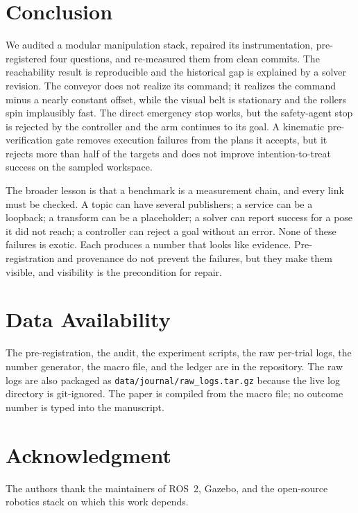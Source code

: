 \documentclass[journal]{IEEEtran}
\begin{document}
\section{Conclusion}
\label{sec:conclusion}
We audited a modular manipulation stack, repaired its instrumentation, pre-registered four questions, and re-measured them from clean commits. The reachability result is reproducible and the historical gap is explained by a solver revision. The conveyor does not realize its command; it realizes the command minus a nearly constant offset, while the visual belt is stationary and the rollers spin implausibly fast. The direct emergency stop works, but the safety-agent stop is rejected by the controller and the arm continues to its goal. A kinematic pre-verification gate removes execution failures from the plans it accepts, but it rejects more than half of the targets and does not improve intention-to-treat success on the sampled workspace.

The broader lesson is that a benchmark is a measurement chain, and every link must be checked. A topic can have several publishers; a service can be a loopback; a transform can be a placeholder; a solver can report success for a pose it did not reach; a controller can reject a goal without an error. None of these failures is exotic. Each produces a number that looks like evidence. Pre-registration and provenance do not prevent the failures, but they make them visible, and visibility is the precondition for repair.

\section*{Data Availability}
The pre-registration, the audit, the experiment scripts, the raw per-trial logs, the number generator, the macro file, and the ledger are in the repository. The raw logs are also packaged as \texttt{data/journal/raw\_logs.tar.gz} because the live log directory is git-ignored. The paper is compiled from the macro file; no outcome number is typed into the manuscript.

\section*{Acknowledgment}
The authors thank the maintainers of ROS~2, Gazebo, and the open-source robotics stack on which this work depends.



\end{document}
